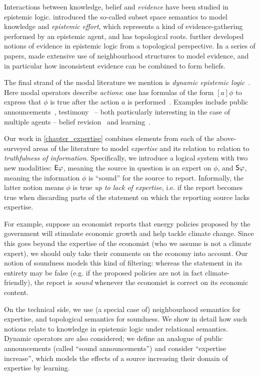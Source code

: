 {Interactions between knowledge, belief and \emph{evidence} have been studied in
epistemic logic. \textcite{moss1992topological} introduced the so-called subset
space semantics to model knowledge and \emph{epistemic effort}, which
represents a kind of evidence-gathering performed by an epistemic agent, and
has topological roots. \textcite{ozgun_evidence} further developed notions of
evidence in epistemic logic from a topological perspective. In a series of
papers, \textcite{van2011dynamic,van2012evidence,vanbenthem2014106} made
extensive use of neighbourhood structures to model evidence, and in particular
how inconsistent evidence can be combined to form beliefs.

The final strand of the modal literature we mention is \emph{dynamic epistemic
logic}~\cite{van_Ditmarsch_2008,sep_del}. Here modal operators describe
\emph{actions}: one has formulas of the form $[a]\phi$ to express that $\phi$
is true after the action $a$ is performed~\cite{sep_del}. Examples include
public announcements~\cite{plaza2007logics},
testimony~\cite{holliday2009dynamic} -- both particularly interesting in the
case of multiple agents -- belief revision~\cite{baltag2008qualitative} and
learning~\cite{gierasimczuk2009bridging,gierasimczuk2010knowing}.

Our work in \cref{chapter_expertise} combines elements from each of the
above-surveyed areas of the literature to model \emph{expertise} and its
relation to relation to \emph{truthfulness of information}. Specifically, we
introduce a logical system with two new modalities: $\E\phi$, meaning the
source in question is an expert on $\phi$, and $\S\phi$, meaning the
information $\phi$ is ``sound'' for the source to report. Informally, the
latter notion means $\phi$ is true \emph{up to lack of expertise}, i.e. if the
report becomes true when discarding parts of the statement on which the
reporting source lacks expertise.

For example, suppose an economist reports that energy policies proposed by the
government will stimulate economic growth and help tackle climate change. Since
this goes beyond the expertise of the economist (who we assume is not a climate
expert), we should only take their comments on the economy into account. Our
notion of soundness models this kind of filtering: whereas the statement in its
entirety may be false (e.g. if the proposed policies are not in fact
climate-friendly), the report is \emph{sound} whenever the economist is correct
on its economic content.

On the technical side, we use (a special case of) neighbourhood semantics for
expertise, and topological semantics for soundness. We show in detail how such
notions relate to knowledge in epistemic logic under relational semantics.
Dynamic operators are also considered; we define an analogue of public
announcements (called ``sound announcements'') and consider ``expertise
increase'', which models the effects of a source increasing their domain of
expertise by learning.

}

